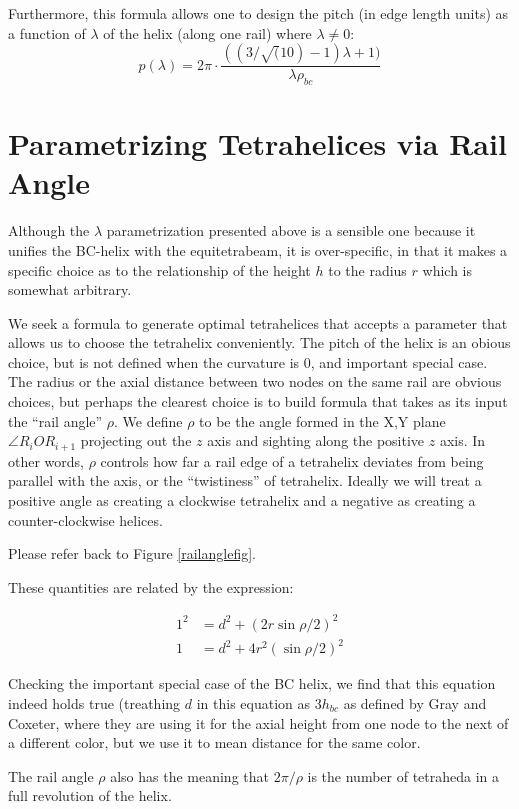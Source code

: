 \documentclass[11pt]{article}
\begin{document}
Furthermore, this formula allows one to design the pitch (in edge length units) as a function of $\lambda$ of the helix (along one rail)
where $\lambda \neq 0$:
\[
p(\lambda) = 2 \pi  \cdot \frac{((3/\sqrt(10) -1) \lambda +1)}{ \lambda  \rho_{bc} }
\]

\section{Parametrizing Tetrahelices via Rail Angle}

Although the $\lambda$ parametrization presented above is a sensible one
because it unifies the BC-helix with the equitetrabeam, it is over-specific,
in that it makes a specific choice as to the relationship of the height $h$
to the radius $r$ which is somewhat arbitrary.

We seek a formula to generate optimal tetrahelices that accepts a
parameter that allows us to choose the tetrahelix conveniently. The
pitch of the helix is an obious choice, but is not defined when the
curvature is $0$, and important special case. The radius or the axial
distance between two nodes on the same rail are obvious choices, but
perhaps the clearest choice is to build formula that takes as its
input the ``rail angle'' $\rho$. We define $\rho$ to be the angle
formed in the X,Y plane $\angle R_i O R_{i+1}$ projecting out the $z$
axis and sighting along the positive $z$ axis. In other words, $\rho$
controls how far a rail edge of a tetrahelix deviates from being
parallel with the axis, or the ``twistiness'' of tetrahelix. Ideally
we will treat a positive angle as creating a clockwise tetrahelix and
a negative as creating a counter-clockwise helices.


Please refer back to Figure \ref{railanglefig}.

 These quantities are related by the expression:

\begin{align*}
  1^2 &= d^2 + (2 r \sin{ \rho / 2})^2 \\
  1 &= d^2 + 4 r^2 (\sin{ \rho / 2})^2 
\end{align*}

Checking the important special case of the BC helix, we find that this equation
indeed holds true (treathing $d$ in this equation as $3 h_{bc}$ as defined by
Gray and Coxeter, where they are using it for the axial height from one node to
the next of a different color, but we use it to mean distance for the same color.

The rail angle $\rho$ also has the meaning that $2 \pi / \rho$ is the number of
tetraheda in a full revolution of the helix.
\end{document}
